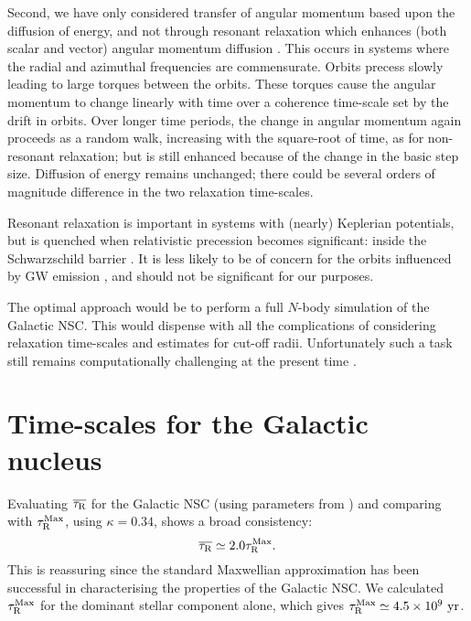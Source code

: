 Second, we have only considered transfer of angular momentum based upon the diffusion of energy, and not through resonant relaxation which enhances (both scalar and vector) angular momentum diffusion \citep{Rauch1996,Rauch1998,Gurkan2007,Eilon2009,Madigan2011}. This occurs in systems where the radial and azimuthal frequencies are commensurate. Orbits precess slowly leading to large torques between the orbits. These torques cause the angular momentum to change linearly with time over a coherence time-scale set by the drift in orbits. Over longer time periods, the change in angular momentum again proceeds as a random walk, increasing with the square-root of time, as for non-resonant relaxation; but is still enhanced because of the change in the basic step size. Diffusion of energy remains unchanged; there could be several orders of magnitude difference in the two relaxation time-scales.

Resonant relaxation is important in systems with (nearly) Keplerian potentials, but is quenched when relativistic precession becomes significant: inside the Schwarzschild barrier \citep{Merritt2011}. It is less likely to be of concern for the orbits influenced by GW emission \citep{Sigurdsson1997}, and should not be significant for our purposes.

The optimal approach would be to perform a full $N$-body simulation of the Galactic NSC. This would dispense with all the complications of considering relaxation time-scales and estimates for cut-off radii. Unfortunately such a task still remains computationally challenging at the present time \citep[e.g.,][]{Li2012}.

\section{Time-scales for the Galactic nucleus}\label{sec:tauGC}

Evaluating $\overline{\tau_\mathrm{R}}$ for the Galactic NSC (using parameters from ) and comparing with $\tau_\mathrm{R}^\mathrm{Max}$,  using $\kappa = 0.34$, shows a broad consistency:
\begin{equation}
\overline{\tau_\mathrm{R}} \simeq 2.0 \tau_\mathrm{R}^\mathrm{Max}.
\end{equation}
This is reassuring since the standard Maxwellian approximation has been successful in characterising the properties of the Galactic NSC. We calculated $\tau_\mathrm{R}^\mathrm{Max}$ for the dominant stellar component alone, which gives $\tau_\mathrm{R}^\mathrm{Max}\simeq 4.5 \times 10^9~\mathrm{yr}$.

